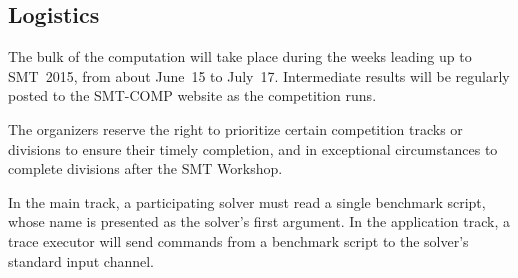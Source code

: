 \documentclass[12pt]{article}
\begin{document}
\subsection{Logistics}

%
The bulk of the computation will take place during the weeks leading
up to SMT~2015, from about June~15 to July~17.  Intermediate results
will be regularly posted to the SMT-COMP website as the competition
runs.

The organizers reserve the right to prioritize certain competition
tracks or divisions to ensure their timely completion, and in
exceptional circumstances to complete divisions after the SMT
Workshop.

%
In the main track, a participating solver must read a single benchmark
script, whose name is presented as the solver's first argument.  In
the application track, a trace executor will send commands from a
benchmark script to the solver's standard input channel.
\end{document}
